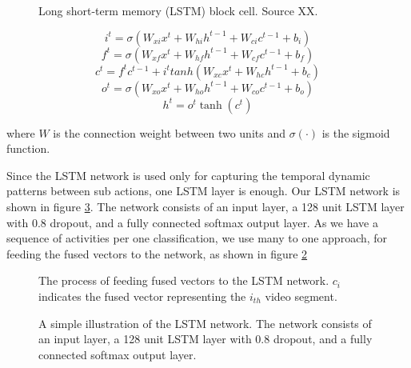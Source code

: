 \begin{figure}
  \centering
  
  \caption{Long short-term memory (LSTM) block cell. Source XX.}\label{fi:lstmblock}
\end{figure}

\begin{equation}
i^{t} = \sigma (W_{xi}x^t + W_{hi}h^{t-1} + W_{ci}c^{t-1} + b_{i})
\end{equation}
\begin{equation}
f^{t} = \sigma (W_{xf}x^t + W_{hf}h^{t-1} + W_{cf}c^{t-1} + b_{f})
\end{equation}
\begin{equation}
c^{t} = f^tc^{t-1} + i^ttanh(W_{xc}x^t + W_{hc}h^{t-1} + b_{c})
\end{equation}
\begin{equation}
o^{t} = \sigma (W_{xo}x^t + W_{ho}h^{t-1} + W_{co}c^{t-1} + b_{o})
\end{equation}
\begin{equation}
h^t = o^t\tanh(c^t)
\end{equation}

where $W$ is the connection weight between two units and $\sigma(\cdot)$ is the sigmoid function.

Since the LSTM network is used only for capturing the temporal dynamic patterns between sub actions, one LSTM layer is enough.
Our LSTM network is shown in figure \ref{fi:layers}. The network consists of an input layer, a 128 unit LSTM layer with 0.8 dropout, and
a fully connected softmax output layer. As we have a sequence of activities per one classification, we use many to one approach,
for feeding the fused vectors to the network, as shown in figure \ref{fi:lstm}

\begin{figure}
  \centering
  
  \caption{The process of feeding fused vectors to the LSTM network. $c_{i}$ indicates the fused vector representing the $i_{th}$
  video segment.}\label{fi:lstm}
\end{figure}

\begin{figure}
  \centering
  
  \caption{A simple illustration of the LSTM network. The network consists of an input layer, a 128 unit LSTM layer with 0.8 dropout, and
a fully connected softmax output layer.}\label{fi:layers}
\end{figure}

